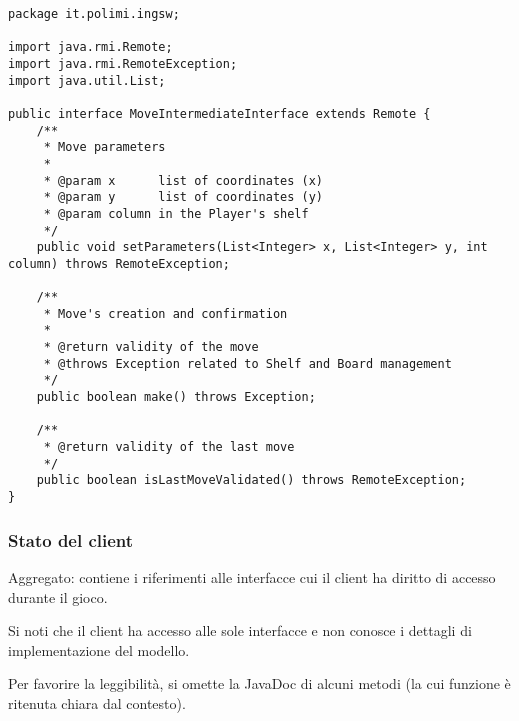 \documentclass[a4paper,11pt]{article} %
\begin{document}
    \begin{verbatim}
package it.polimi.ingsw;

import java.rmi.Remote;
import java.rmi.RemoteException;
import java.util.List;

public interface MoveIntermediateInterface extends Remote {
    /**
     * Move parameters
     *
     * @param x      list of coordinates (x)
     * @param y      list of coordinates (y)
     * @param column in the Player's shelf
     */
    public void setParameters(List<Integer> x, List<Integer> y, int column) throws RemoteException;

    /**
     * Move's creation and confirmation
     *
     * @return validity of the move
     * @throws Exception related to Shelf and Board management
     */
    public boolean make() throws Exception;

    /**
     * @return validity of the last move
     */
    public boolean isLastMoveValidated() throws RemoteException;
}
    \end{verbatim}

    \newpage

    \subsubsection{Stato del client}
    Aggregato: contiene i riferimenti alle interfacce cui il client ha diritto di accesso durante il gioco.

    Si noti che il client ha accesso alle sole interfacce e non conosce i dettagli di implementazione del modello.

    \smallskip

    Per favorire la leggibilità, si omette la JavaDoc di alcuni metodi (la cui funzione è ritenuta chiara dal contesto).
\end{document}
